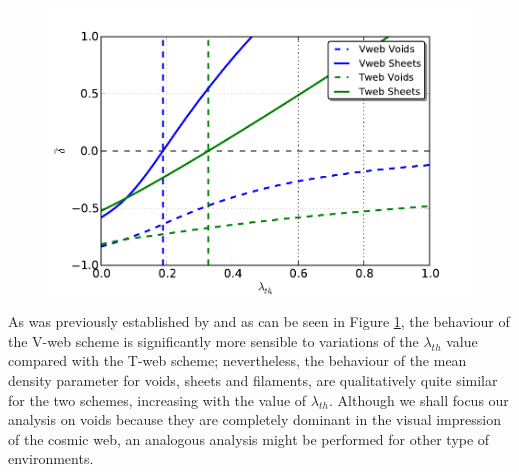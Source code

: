 \documentclass[a4,useAMS,usenatbib,usegraphicx]{latex/mn2e}
\begin{document}
\begin{flushleft}
\begin{figure}
\centering

  \includegraphics[trim = 0mm 0mm 12mm 5mm, clip, keepaspectratio=true,
  width=0.3\textheight]{./figures/cell_types_density.pdf}


  \label{fig:mean_density}
  \vspace{0.1 cm}

\end{figure}
\end{flushleft}



As was previously established by  and as 
can be seen in Figure \ref{fig:mean_density}, the behaviour of the 
V-web scheme is significantly more sensible to variations of the 
$\lambda_{th}$ value compared with the T-web scheme; nevertheless, the 
behaviour of the mean density parameter for voids, sheets and filaments, 
are qualitatively quite similar for the two schemes, increasing with the 
value of $\lambda_{th}$. Although we shall focus our analysis on voids 
because they are completely dominant in the visual impression of the 
cosmic web, an analogous analysis might be performed for other type of 
environments.
\end{document}
